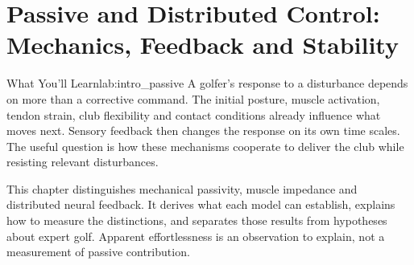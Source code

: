 \chapter[Passive and Distributed Control]{Passive and Distributed Control:\\Mechanics, Feedback and Stability}
\label{ch:passive_distributed_control}
\raggedbottom
{}

\begin{laymansbox}{What You'll Learn}{lab:intro_passive}
A golfer's response to a disturbance depends on more than a corrective command. The initial posture, muscle activation, tendon strain, club flexibility and contact conditions already influence what moves next. Sensory feedback then changes the response on its own time scales. The useful question is how these mechanisms cooperate to deliver the club while resisting relevant disturbances.

This chapter distinguishes mechanical passivity, muscle impedance and distributed neural feedback. It derives what each model can establish, explains how to measure the distinctions, and separates those results from hypotheses about expert golf. Apparent effortlessness is an observation to explain, not a measurement of passive contribution.
\end{laymansbox}

